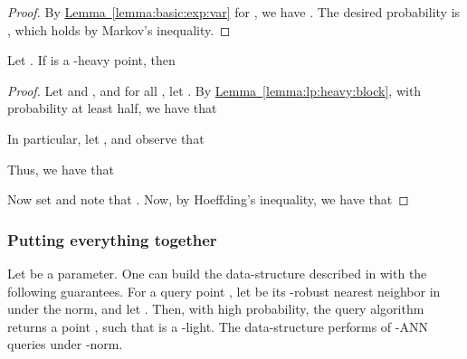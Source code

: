 \documentclass[12pt]{article}\usepackage[cm]{fullpage}
\newcommand{\Term}[1]{\textsf{#1}}
\theoremstyle{remark}\theoremheaderfont{\sf}\theorembodyfont{\upshape}\newtheorem{defn}[theorem]{Definition}
\numberwithin{figure}{section}\numberwithin{table}{section}\numberwithin{equation}{section}
\newcommand{\HLink}[2]{\hyperref[#2]{#1~\ref*{#2}}}
\newcommand{\lemlab}[1]{\label{lemma:#1}}
\newcommand{\lemref}[1]{\HLink{Lemma}{lemma:#1}}
\newcommand{\ANN}{\Term{ANN}\xspace}\newcommand{\NN}{\Term{NN}\xspace}
\begin{document}
\begin{proof}
    By \lemref{basic:exp:var} for
    , we have
    .
    The desired probability is , which
    holds by Markov's inequality.
\end{proof}

\begin{lemma}
    \lemlab{lp:heavy:far}Let . If  is a
    -heavy point, then
    
\end{lemma}
\begin{proof}Let  and
    , and for all , let
    . By
    \lemref{lp:heavy:block}, with probability at least half, we have
    that
    
    In particular, let , and
    observe that
    
    Thus, we have that
    
    Now set  and note that
    .  Now, by Hoeffding's inequality, we have
    that
    
\end{proof}

\subsubsection{Putting everything together}

\begin{lemma}
    \lemlab{lp:heavy:tail}
Let  be a parameter.  One can build the
    data-structure described in  with the following
    guarantees.  For a query point , let
     be its -robust nearest neighbor in 
    under the  norm, and let
    . Then, with high
    probability, the query algorithm returns a point
    , such that  is a
    -light.
    The data-structure performs  of
    -\ANN queries under -norm.
\end{lemma}
\end{document}
